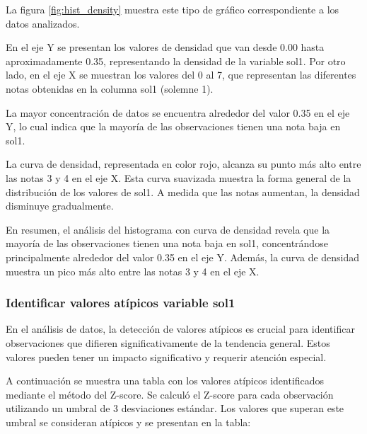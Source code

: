 La figura \ref{fig:hist_density} muestra este tipo de gráfico correspondiente a los datos analizados.

En el eje Y se presentan los valores de densidad que van desde 0.00 hasta aproximadamente 0.35, representando la densidad de la variable sol1. Por otro lado, en el eje X se muestran los valores del 0 al 7, que representan las diferentes notas obtenidas en la columna sol1 (solemne 1).

La mayor concentración de datos se encuentra alrededor del valor 0.35 en el eje Y, lo cual indica que la mayoría de las observaciones tienen una nota baja en sol1.

La curva de densidad, representada en color rojo, alcanza su punto más alto entre las notas 3 y 4 en el eje X. Esta curva suavizada muestra la forma general de la distribución de los valores de sol1. A medida que las notas aumentan, la densidad disminuye gradualmente.

En resumen, el análisis del histograma con curva de densidad revela que la mayoría de las observaciones tienen una nota baja en sol1, concentrándose principalmente alrededor del valor 0.35 en el eje Y. Además, la curva de densidad muestra un pico más alto entre las notas 3 y 4 en el eje X.

\subsubsection{Identificar valores atípicos variable sol1}

En el análisis de datos, la detección de valores atípicos es crucial para identificar observaciones que difieren significativamente de la tendencia general. Estos valores pueden tener un impacto significativo y requerir atención especial.

A continuación se muestra una tabla con los valores atípicos identificados mediante el método del Z-score. Se calculó el Z-score para cada observación utilizando un umbral de 3 desviaciones estándar. Los valores que superan este umbral se consideran atípicos y se presentan en la tabla:

